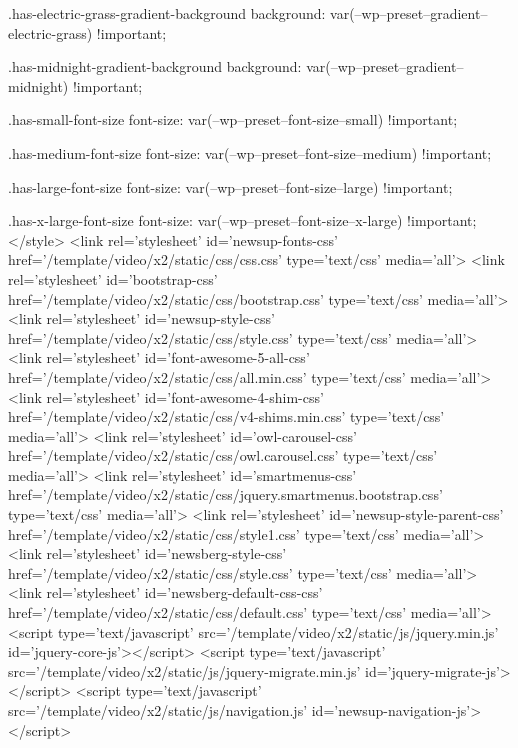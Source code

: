         .has-electric-grass-gradient-background {
            background: var(--wp--preset--gradient--electric-grass) !important;
        }

        .has-midnight-gradient-background {
            background: var(--wp--preset--gradient--midnight) !important;
        }

        .has-small-font-size {
            font-size: var(--wp--preset--font-size--small) !important;
        }

        .has-medium-font-size {
            font-size: var(--wp--preset--font-size--medium) !important;
        }

        .has-large-font-size {
            font-size: var(--wp--preset--font-size--large) !important;
        }

        .has-x-large-font-size {
            font-size: var(--wp--preset--font-size--x-large) !important;
        }
    </style>
    <link rel='stylesheet' id='newsup-fonts-css' href='/template/video/x2/static/css/css.css' type='text/css' media='all'>
    <link rel='stylesheet' id='bootstrap-css' href='/template/video/x2/static/css/bootstrap.css' type='text/css' media='all'>
    <link rel='stylesheet' id='newsup-style-css' href='/template/video/x2/static/css/style.css' type='text/css' media='all'>
    <link rel='stylesheet' id='font-awesome-5-all-css' href='/template/video/x2/static/css/all.min.css' type='text/css' media='all'>
    <link rel='stylesheet' id='font-awesome-4-shim-css' href='/template/video/x2/static/css/v4-shims.min.css' type='text/css' media='all'>
    <link rel='stylesheet' id='owl-carousel-css' href='/template/video/x2/static/css/owl.carousel.css' type='text/css' media='all'>
    <link rel='stylesheet' id='smartmenus-css' href='/template/video/x2/static/css/jquery.smartmenus.bootstrap.css' type='text/css' media='all'>
    <link rel='stylesheet' id='newsup-style-parent-css' href='/template/video/x2/static/css/style1.css' type='text/css' media='all'>
    <link rel='stylesheet' id='newsberg-style-css' href='/template/video/x2/static/css/style.css' type='text/css' media='all'>
    <link rel='stylesheet' id='newsberg-default-css-css' href='/template/video/x2/static/css/default.css' type='text/css' media='all'>
    <script type='text/javascript' src='/template/video/x2/static/js/jquery.min.js' id='jquery-core-js'></script>
    <script type='text/javascript' src='/template/video/x2/static/js/jquery-migrate.min.js' id='jquery-migrate-js'></script>
    <script type='text/javascript' src='/template/video/x2/static/js/navigation.js' id='newsup-navigation-js'></script>
